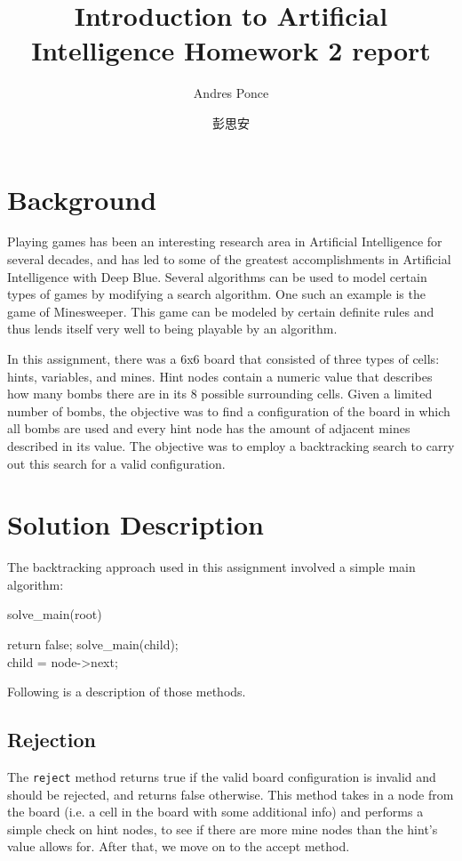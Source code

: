 \documentclass{article}
\author{Andres Ponce \\
\and
彭思安}
\title{Introduction to Artificial Intelligence Homework 2 report}
\begin{document}
\maketitle
\section{Background}
Playing games has been an interesting research area in Artificial Intelligence
for several decades, and has led to some of the greatest accomplishments in Artificial
Intelligence with Deep Blue. Several algorithms can be used to model certain types of games 
by modifying a search algorithm. One such an example is the game of Minesweeper. This game can 
be modeled by certain definite rules and thus lends itself very well to being playable by an algorithm.

In this assignment, there was a 6x6 board that consisted of three types of cells: hints, variables, and mines.
Hint nodes contain a numeric value that describes how many bombs there are in its 8 possible surrounding cells.
Given a limited number of bombs, the objective was to find a configuration of the board in which all bombs are used
and every hint node has the amount of adjacent mines described in its value. The objective was to employ
a backtracking search to carry out this search for a valid configuration. 

\section{Solution Description}
The backtracking approach used in this assignment involved a simple main algorithm:

\begin{algorithm}[H]
		\caption{solve\_main(root)}
		{
			return false;
		}
		{
			solve\_main(child);\\
			child = node->next;
		}
\end{algorithm}
Following is a description of those methods.
\subsection{Rejection}
The \texttt{reject} method returns true if the valid board configuration is invalid and should be rejected, and
returns false otherwise. This method takes in a node from the board (i.e. a cell in the board with some 
additional info) and performs a simple check on hint nodes, to see if there are more mine nodes than 
the hint's value allows for. After that, we move on to the accept method.
\end{document}
